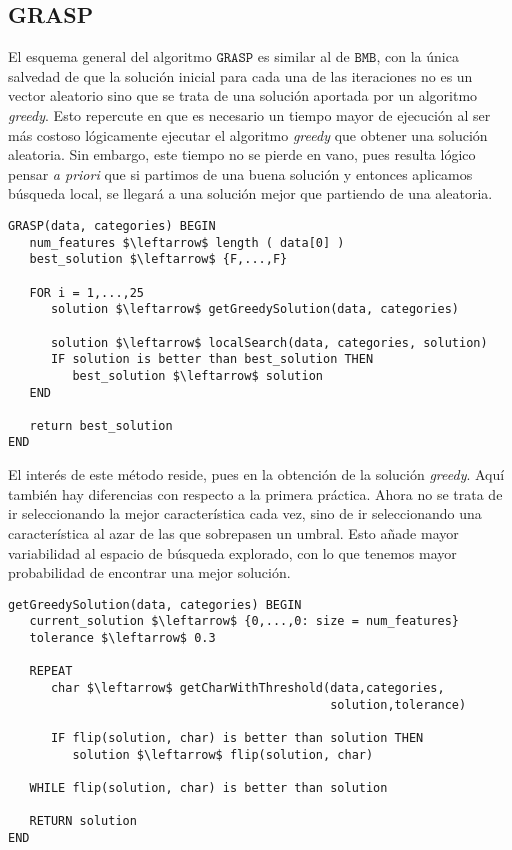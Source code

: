 \documentclass[11pt,leqno]{article}
\begin{document}
\subsection{GRASP}

	El esquema general del algoritmo $\texttt{GRASP}$ es similar al de $\texttt{BMB}$, con la única salvedad de que la solución inicial para cada una de las iteraciones no es un vector aleatorio sino que se trata de una solución aportada por un algoritmo \textit{greedy}. Esto repercute en que es necesario un tiempo mayor de ejecución al ser más costoso lógicamente ejecutar el algoritmo \textit{greedy} que obtener una solución aleatoria. Sin embargo, este tiempo no se pierde en vano, pues resulta lógico pensar \textit{a priori} que si partimos de una buena solución y entonces aplicamos búsqueda local, se llegará a una solución mejor que partiendo de una aleatoria.
	
		\begin{lstlisting}[mathescape=true]
GRASP(data, categories) BEGIN	
   num_features $\leftarrow$ length ( data[0] )
   best_solution $\leftarrow$ {F,...,F}
   
   FOR i = 1,...,25
      solution $\leftarrow$ getGreedySolution(data, categories)
                                   
      solution $\leftarrow$ localSearch(data, categories, solution)
      IF solution is better than best_solution THEN
         best_solution $\leftarrow$ solution
   END
	
   return best_solution
END
	\end{lstlisting}
	
	El interés de este método reside, pues en la obtención de la solución \textit{greedy}. Aquí también hay diferencias con respecto a la primera práctica. Ahora no se trata de ir seleccionando la mejor característica cada vez, sino de ir seleccionando una característica al azar de las que sobrepasen un umbral. Esto añade mayor variabilidad al espacio de búsqueda explorado, con lo que tenemos mayor probabilidad de encontrar una mejor solución. 
	
	
	\begin{lstlisting}[mathescape=true]
getGreedySolution(data, categories) BEGIN
   current_solution $\leftarrow$ {0,...,0: size = num_features}
   tolerance $\leftarrow$ 0.3
   
   REPEAT
      char $\leftarrow$ getCharWithThreshold(data,categories,
                                             solution,tolerance)
      
      IF flip(solution, char) is better than solution THEN
         solution $\leftarrow$ flip(solution, char)
   
   WHILE flip(solution, char) is better than solution
   
   RETURN solution
END
	\end{lstlisting}
	
\end{document}
